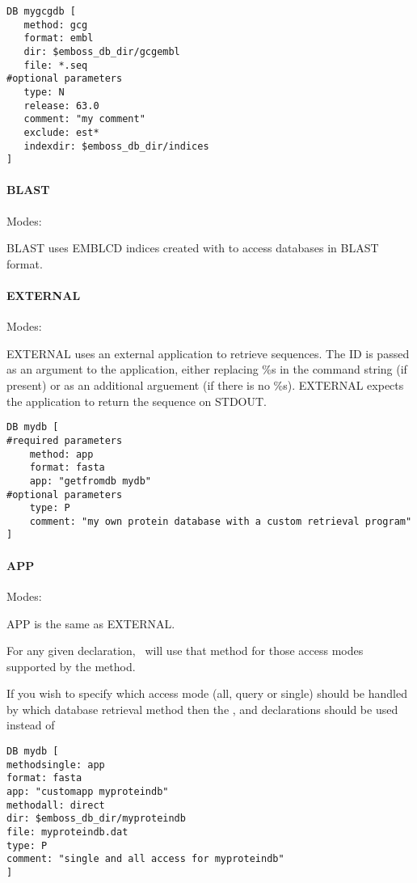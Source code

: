 \documentclass{report}
\begin{document}
\begin{verbatim}
DB mygcgdb [
   method: gcg
   format: embl
   dir: $emboss_db_dir/gcgembl
   file: *.seq
#optional parameters
   type: N
   release: 63.0
   comment: "my comment"
   exclude: est*
   indexdir: $emboss_db_dir/indices
]
\end{verbatim}

 
\paragraph{BLAST}\par\noindent
Modes:  \par\noindent
BLAST uses EMBLCD indices created with  to access databases in BLAST format. 


\paragraph{EXTERNAL}\par\noindent
Modes: \par\noindent
EXTERNAL uses an external application to retrieve sequences. 
The ID is passed as an argument to the application, either replacing \%s in the command string (if present) or as an additional arguement (if there is no \%s).
EXTERNAL expects the application to return the sequence on STDOUT. 

\begin{verbatim}
DB mydb [
#required parameters
    method: app
    format: fasta
    app: "getfromdb mydb"
#optional parameters
    type: P
    comment: "my own protein database with a custom retrieval program"
]
\end{verbatim}

\paragraph{APP}\par\noindent
Modes: \par\noindent
APP is the same as EXTERNAL.

For any given  declaration, \EMBOSS\ will use that method for those access modes supported by the method.

If you wish to specify which access mode (all, query or single) should be handled by which database retrieval method then the ,  and  declarations should be used instead of 
\begin{verbatim}
DB mydb [
methodsingle: app
format: fasta
app: "customapp myproteindb"
methodall: direct
dir: $emboss_db_dir/myproteindb
file: myproteindb.dat
type: P
comment: "single and all access for myproteindb"
]
\end{verbatim}
\end{document}
